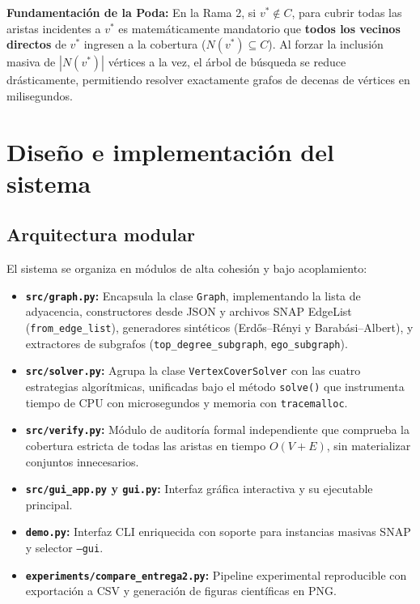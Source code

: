 \documentclass[11pt,a4paper]{article}
\begin{document}
\textbf{Fundamentación de la Poda:} En la Rama 2, si $v^* \notin C$, para cubrir todas las aristas incidentes a $v^*$ es matemáticamente mandatorio que \textbf{todos los vecinos directos} de $v^*$ ingresen a la cobertura ($N(v^*) \subseteq C$). Al forzar la inclusión masiva de $|N(v^*)|$ vértices a la vez, el árbol de búsqueda se reduce drásticamente, permitiendo resolver exactamente grafos de decenas de vértices en milisegundos.

\section{Diseño e implementación del sistema}
\label{sec:diseno-sistema}

\subsection{Arquitectura modular}
El sistema se organiza en módulos de alta cohesión y bajo acoplamiento:
\begin{itemize}[itemsep=2pt]
	\item \textbf{\texttt{src/graph.py}:} Encapsula la clase \texttt{Graph}, implementando la lista de adyacencia, constructores desde JSON y archivos SNAP EdgeList (\texttt{from\_edge\_list}), generadores sintéticos (Erdős–Rényi y Barabási–Albert), y extractores de subgrafos (\texttt{top\_degree\_subgraph}, \texttt{ego\_subgraph}).
	\item \textbf{\texttt{src/solver.py}:} Agrupa la clase \texttt{VertexCoverSolver} con las cuatro estrategias algorítmicas, unificadas bajo el método \texttt{solve()} que instrumenta tiempo de CPU con microsegundos y memoria con \texttt{tracemalloc}.
	\item \textbf{\texttt{src/verify.py}:} Módulo de auditoría formal independiente que comprueba la cobertura estricta de todas las aristas en tiempo $O(V+E)$, sin materializar conjuntos innecesarios.
	\item \textbf{\texttt{src/gui\_app.py} y \texttt{gui.py}:} Interfaz gráfica interactiva y su ejecutable principal.
	\item \textbf{\texttt{demo.py}:} Interfaz CLI enriquecida con soporte para instancias masivas SNAP y selector \texttt{--gui}.
	\item \textbf{\texttt{experiments/compare\_entrega2.py}:} Pipeline experimental reproducible con exportación a CSV y generación de figuras científicas en PNG.
\end{itemize}
\end{document}
